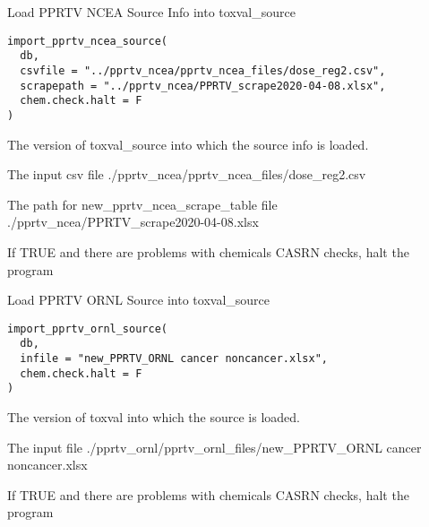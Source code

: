 \documentclass[letterpaper]{book}
\begin{document}
%
\begin{Description}\relax
Load PPRTV NCEA Source Info into toxval\_source
\end{Description}
%
\begin{Usage}
\begin{verbatim}
import_pprtv_ncea_source(
  db,
  csvfile = "../pprtv_ncea/pprtv_ncea_files/dose_reg2.csv",
  scrapepath = "../pprtv_ncea/PPRTV_scrape2020-04-08.xlsx",
  chem.check.halt = F
)
\end{verbatim}
\end{Usage}
%
\begin{Arguments}
\begin{ldescription}
\item[\code{db}] The version of toxval\_source into which the source info is loaded.

\item[\code{csvfile}] The input csv file ./pprtv\_ncea/pprtv\_ncea\_files/dose\_reg2.csv

\item[\code{scrapepath}] The path for new\_pprtv\_ncea\_scrape\_table file ./pprtv\_ncea/PPRTV\_scrape2020-04-08.xlsx

\item[\code{chem.check.halt}] If TRUE and there are problems with chemicals CASRN checks, halt the program
\end{ldescription}
\end{Arguments}
%
\begin{Description}\relax
Load PPRTV ORNL Source into toxval\_source
\end{Description}
%
\begin{Usage}
\begin{verbatim}
import_pprtv_ornl_source(
  db,
  infile = "new_PPRTV_ORNL cancer noncancer.xlsx",
  chem.check.halt = F
)
\end{verbatim}
\end{Usage}
%
\begin{Arguments}
\begin{ldescription}
\item[\code{db}] The version of toxval into which the source is loaded.

\item[\code{infile}] The input file ./pprtv\_ornl/pprtv\_ornl\_files/new\_PPRTV\_ORNL cancer noncancer.xlsx

\item[\code{chem.check.halt}] If TRUE and there are problems with chemicals CASRN checks, halt the program
\end{ldescription}
\end{Arguments}
\end{document}
